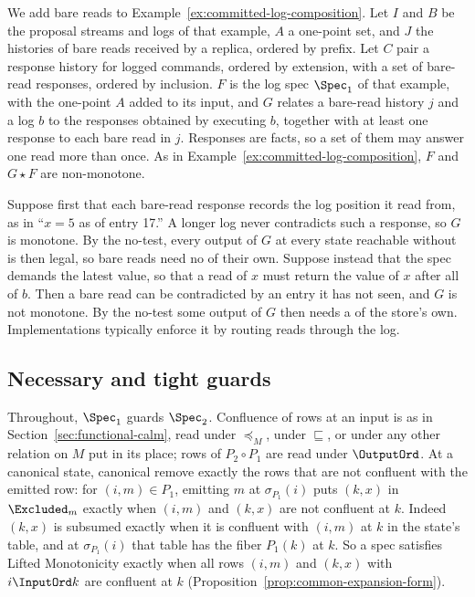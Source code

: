 \begin{example}
\label{ex:bare-reads}
We add bare reads to Example~\ref{ex:committed-log-composition}.  Let $I$
and $B$ be the proposal streams and logs of that example, $A$ a one-point set,
and $J$ the histories of bare reads received by a replica, ordered by prefix.
Let $C$ pair a response history for logged commands, ordered by extension,
with a set of bare-read responses, ordered by inclusion.  $F$ is the log spec
$\Spec_1$ of that example, with the one-point $A$ added to its input, and $G$
relates a bare-read history $j$ and a log $b$ to the responses
obtained by executing $b$, together with at least one response to each bare
read in $j$.  Responses are facts, so a set of them may answer one read more
than once.  As in Example~\ref{ex:committed-log-composition}, $F$ and
$G\star F$ are non-monotone.

Suppose first that each bare-read response records the log position it read
from, as in ``$x=5$ as of entry 17.''  A longer log never contradicts such a
response, so $G$ is monotone.  By the no-\commitment test, every output of
$G$ at every state reachable without \commitment is then legal, so bare reads
need no \commitment of their own.  Suppose instead that the spec
demands the latest value, so that a read of $x$ must return the value of $x$
after all of $b$.  Then a bare read can be contradicted by an entry it has not
seen, and $G$ is not monotone.  By the no-\commitment test some output of $G$
then needs a \commitment of the store's own.  Implementations typically
enforce it by routing reads through the log.
\end{example}

\subsection{Necessary and tight guards}
\label{app:tight}

Throughout, $\Spec_1$ guards $\Spec_2$.  Confluence of rows at an input is
as in Section~\ref{sec:functional-calm}, read under $\preceq_M$, under
$\sqsubseteq$, or under any other relation on $M$ put in its place; rows of
$P_2\circ P_1$ are read under $\OutputOrd$.  At a canonical state, canonical
\commitments remove exactly the rows that are not confluent with the emitted row: for
$(i,m)\in P_1$, emitting $m$ at $\sigma_{P_1}(i)$ puts $(k,x)$ in
$\Excluded_m$ exactly when $(i,m)$ and $(k,x)$ are not confluent at $k$.
Indeed $(k,x)$ is subsumed exactly when it is confluent with $(i,m)$ at $k$
in the state's table, and at $\sigma_{P_1}(i)$ that table has the fiber
$P_1(k)$ at $k$.  So a spec satisfies Lifted Monotonicity exactly when all rows $(i,m)$ and $(k,x)$ with $i\InputOrd k$ are confluent at $k$
(Proposition~\ref{prop:common-expansion-form}).

